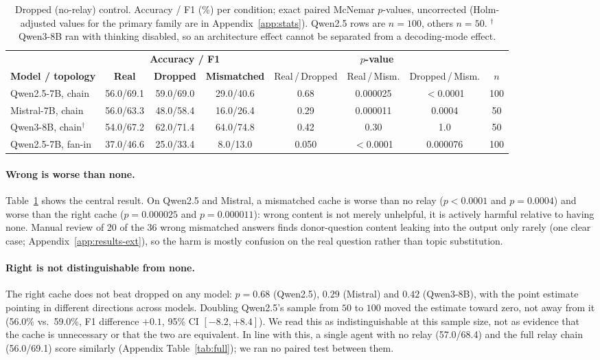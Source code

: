 \documentclass[11pt]{article}
\begin{document}
\begin{table}[t]
\centering
\small
\caption{Dropped (no-relay) control. Accuracy / F1 (\%) per condition; exact
paired McNemar $p$-values, uncorrected (Holm-adjusted values for the
primary family are in Appendix~\ref{app:stats}). Qwen2.5 rows are $n{=}100$,
others $n{=}50$. $^\dagger$Qwen3-8B ran with thinking disabled, so an
architecture effect cannot be separated from a decoding-mode effect.}
\label{tab:no_relay}
\begin{tabular}{lccccccc}
\toprule
 & \multicolumn{3}{c}{\textbf{Accuracy / F1}} & \multicolumn{3}{c}{\textbf{$p$-value}} & \\
\cmidrule(lr){2-4}\cmidrule(lr){5-7}
\textbf{Model / topology} & \textcolor{realblue}{\textbf{Real}} & \textbf{Dropped} & \textcolor{wrongred}{\textbf{Mismatched}} & Real\,/\,Dropped & Real\,/\,Mism. & Dropped\,/\,Mism. & $n$ \\
\midrule
Qwen2.5-7B, chain        & 56.0/69.1 & 59.0/69.0 & 29.0/40.6 & 0.68  & 0.000025 & $<$0.0001 & 100 \\
Mistral-7B, chain        & 56.0/63.3 & 48.0/58.4 & 16.0/26.4 & 0.29  & 0.000011 & 0.0004    & 50 \\
Qwen3-8B, chain$^\dagger$& 54.0/67.2 & 62.0/71.4 & 64.0/74.8 & 0.42  & 0.30     & 1.0       & 50 \\
\midrule
Qwen2.5-7B, fan-in       & 37.0/46.6 & 25.0/33.4 & 8.0/13.0  & 0.050 & $<$0.0001 & 0.000076 & 100 \\
\bottomrule
\end{tabular}
\end{table}

\paragraph{Wrong is worse than none.} Table~\ref{tab:no_relay} shows the
central result. On Qwen2.5 and Mistral, a mismatched cache is worse than
no relay ($p<0.0001$ and $p=0.0004$) and worse than the right cache
($p=0.000025$ and $p=0.000011$): wrong content is not merely unhelpful,
it is actively harmful relative to having none. Manual review of 20 of the
36 wrong mismatched answers finds donor-question content leaking into the
output only rarely (one clear case; Appendix~\ref{app:results-ext}), so
the harm is mostly confusion on the real question rather than topic
substitution.

\paragraph{Right is not distinguishable from none.} The right cache does
not beat dropped on any model: $p=0.68$ (Qwen2.5), $0.29$ (Mistral) and
$0.42$ (Qwen3-8B), with the point estimate pointing in different
directions across models. Doubling Qwen2.5's sample from $50$ to $100$
moved the estimate toward zero, not away from it (56.0\% vs.\ 59.0\%, F1
difference $+0.1$, 95\% CI $[-8.2,+8.4]$). We read this as
indistinguishable at this sample size, not as evidence that the cache is
unnecessary or that the two are equivalent. In line with this, a single
agent with no relay (57.0/68.4) and the full relay chain (56.0/69.1) score
similarly (Appendix Table~\ref{tab:full}); we ran no paired test between
them.
\end{document}
